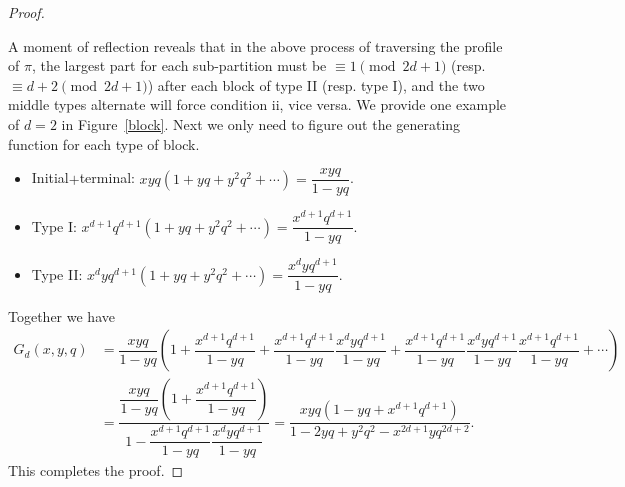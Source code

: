 \documentclass[12pt]{amsart}
\numberwithin{equation}{section}
\theoremstyle{plain}
\theoremstyle{definition}
\begin{document}
\begin{proof}
\begin{itemize}
\end{itemize}
A moment of reflection reveals that in the above process of traversing the profile of $\pi$, the largest part for each sub-partition must be $\equiv 1 \pmod{2d+1}$ (resp. $\equiv d+2 \pmod{2d+1}$) after each block of type II (resp. type I), and the two middle types alternate will force condition ii, vice versa. We provide one example of $d=2$ in Figure~\ref{block}. Next we only need to figure out the generating function for each type of block.
\begin{itemize}
\item Initial$+$terminal: $xyq(1+yq+y^2q^2+\cdots)=\dfrac{xyq}{1-yq}$.
\item Type I: $x^{d+1}q^{d+1}(1+yq+y^2q^2+\cdots)=\dfrac{x^{d+1}q^{d+1}}{1-yq}$.
\item Type II: $x^dyq^{d+1}(1+yq+y^2q^2+\cdots)=\dfrac{x^{d}yq^{d+1}}{1-yq}$.
\end{itemize}
Together we have
\begin{align*}
G_d(x,y,q) &=\dfrac{xyq}{1-yq}(1+\dfrac{x^{d+1}q^{d+1}}{1-yq}+\dfrac{x^{d+1}q^{d+1}}{1-yq}\dfrac{x^{d}yq^{d+1}}{1-yq}+\dfrac{x^{d+1}q^{d+1}}{1-yq}\dfrac{x^{d}yq^{d+1}}{1-yq}\dfrac{x^{d+1}q^{d+1}}{1-yq}+\cdots)\\
&=\dfrac{\dfrac{xyq}{1-yq}(1+\dfrac{x^{d+1}q^{d+1}}{1-yq})}{1-\dfrac{x^{d+1}q^{d+1}}{1-yq}\dfrac{x^{d}yq^{d+1}}{1-yq}}=\dfrac{xyq(1-yq+x^{d+1}q^{d+1})}{1-2yq+y^2q^2-x^{2d+1}yq^{2d+2}}.
\end{align*}
This completes the proof.
\end{proof}
\end{document}
